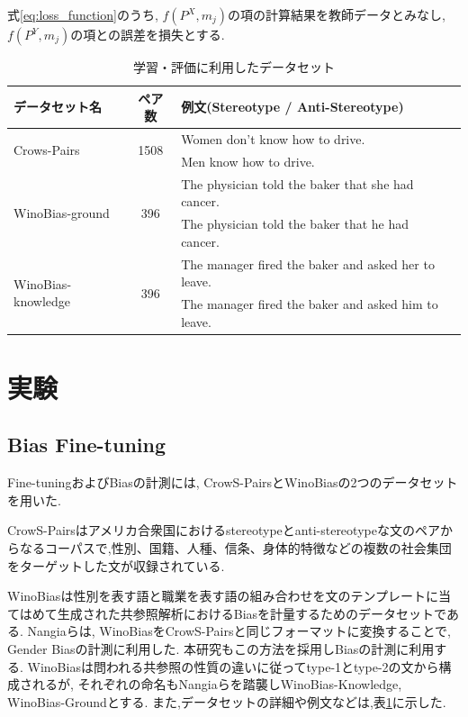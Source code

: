 \documentclass[
  platex, dvipdfmx %
]{nlp2021}
\begin{document}
式\ref{eq:loss_function}のうち, $f(P^X, m_j)$の項の計算結果を教師データとみなし, $f(P^Y, m_j)$の項との誤差を損失とする.


\begin{table}[h]
\centering
\begin{tabular}{lcll}
\hline
データセット名 & ペア数 & 例文(Stereotype / Anti-Stereotype) \\
\hline
\multirow{2}{*}{Crows-Pairs} & \multirow{2}{*}{1508} & Women don't know how to drive.\\
 & & Men know how to drive. \\
\hline
\multirow{2}{*}{WinoBias-ground} & \multirow{2}{*}{396} & The physician told the baker that she had cancer.\\
 & & The physician told the baker that he had cancer. \\
\hline
\multirow{2}{*}{WinoBias-knowledge} & \multirow{2}{*}{396} & The manager fired the baker and asked her to leave.\\
 & & The manager fired the baker and asked him to leave. \\
\hline
\end{tabular}
\caption{学習・評価に利用したデータセット}
\label{tab:datasets}
\end{table}

\section{実験}
\subsection{Bias Fine-tuning}
Fine-tuningおよびBiasの計測には, CrowS-Pairs\cite{nangia2020crows}とWinoBias\cite{zhao-etal-2018-gender}の2つのデータセットを用いた.

CrowS-Pairsはアメリカ合衆国におけるstereotypeとanti-stereotypeな文のペアからなるコーパスで,性別、国籍、人種、信条、身体的特徴などの複数の社会集団をターゲットした文が収録されている.

WinoBiasは性別を表す語と職業を表す語の組み合わせを文のテンプレートに当てはめて生成された共参照解析におけるBiasを計量するためのデータセットである. Nangiaら\cite{nangia2020crows}は, WinoBiasをCrowS-Pairsと同じフォーマットに変換することで, Gender Biasの計測に利用した. 本研究もこの方法を採用しBiasの計測に利用する. WinoBiasは問われる共参照の性質の違いに従ってtype-1とtype-2の文から構成されるが, それぞれの命名もNangiaらを踏襲しWinoBias-Knowledge, WinoBias-Groundとする.
また,データセットの詳細や例文などは,表\ref{tab:datasets}に示した.
\end{document}
